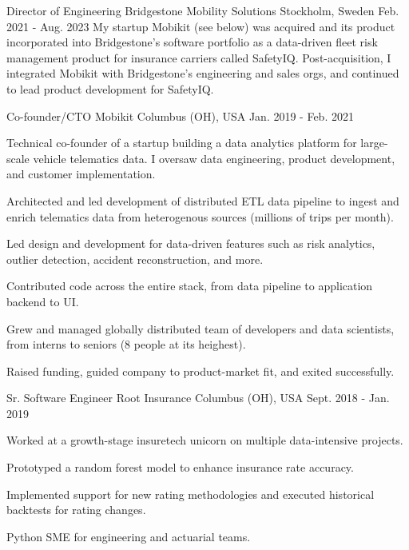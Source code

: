 \begin{cventries}
  \cventry
    {Director of Engineering} %
    {Bridgestone Mobility Solutions} %
    {Stockholm, Sweden} %
    {Feb. 2021 - Aug. 2023} %
    {
    My startup Mobikit (see below) was acquired and its product incorporated into Bridgestone's software portfolio as a data-driven fleet risk management product for insurance carriers called SafetyIQ. Post-acquisition, I integrated Mobikit with Bridgestone's engineering and sales orgs, and continued to lead product development for SafetyIQ.
    }

  \cventry
    {Co-founder/CTO} %
    {Mobikit} %
    {Columbus (OH), USA} %
    {Jan. 2019 - Feb. 2021} %
    {
      Technical co-founder of a startup building a data analytics platform for large-scale vehicle telematics data. I oversaw data engineering, product development, and customer implementation.
      \vspace{5.0mm}
      \begin{cvitems} %
        \item {Architected and led development of distributed ETL data pipeline to ingest and enrich telematics data from heterogenous sources (millions of trips per month).}
        \item {Led design and development for data-driven features such as risk analytics, outlier detection, accident reconstruction, and more.}
        \item {Contributed code across the entire stack, from data pipeline to application backend to UI.}
        \item {Grew and managed globally distributed team of developers and data scientists, from interns to seniors (8 people at its heighest).}
        \item {Raised funding, guided company to product-market fit, and exited successfully.}
      \end{cvitems}
    }

  \cventry
    {Sr. Software Engineer} %
    {Root Insurance} %
    {Columbus (OH), USA} %
    {Sept. 2018 - Jan. 2019} %
    {
      Worked at a growth-stage insuretech unicorn on multiple data-intensive projects.
      \vspace{5.0mm}
      \begin{cvitems} %
        \item {Prototyped a random forest model to enhance insurance rate accuracy.}
        \item {Implemented support for new rating methodologies and executed historical backtests for rating changes.}
        \item {Python SME for engineering and actuarial teams.}
      \end{cvitems}
    }


\end{cventries}
